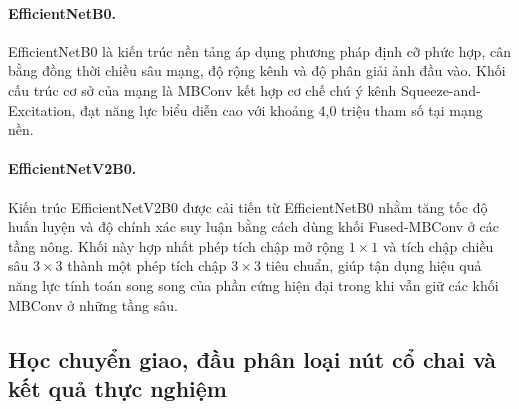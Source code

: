 \paragraph{EfficientNetB0.}
EfficientNetB0 \cite{tan2019efficientnet} là kiến trúc nền tảng áp dụng phương pháp định cỡ phức hợp, cân bằng đồng thời chiều sâu mạng, độ rộng kênh và độ phân giải ảnh đầu vào. Khối cấu trúc cơ sở của mạng là MBConv kết hợp cơ chế chú ý kênh Squeeze-and-Excitation, đạt năng lực biểu diễn cao với khoảng 4,0 triệu tham số tại mạng nền.

\paragraph{EfficientNetV2B0.}
Kiến trúc EfficientNetV2B0 \cite{tan2021efficientnetv2} được cải tiến từ EfficientNetB0 nhằm tăng tốc độ huấn luyện và độ chính xác suy luận bằng cách dùng khối Fused-MBConv ở các tầng nông. Khối này hợp nhất phép tích chập mở rộng $1\times 1$ và tích chập chiều sâu $3\times 3$ thành một phép tích chập $3\times 3$ tiêu chuẩn, giúp tận dụng hiệu quả năng lực tính toán song song của phần cứng hiện đại trong khi vẫn giữ các khối MBConv ở những tầng sâu.

\subsection{Học chuyển giao, đầu phân loại nút cổ chai và kết quả thực nghiệm}
\label{subsec:transfer-learning-pipeline}

